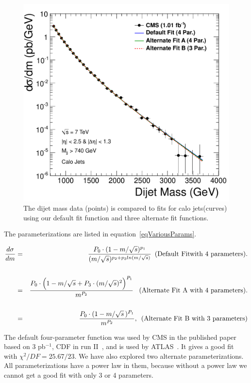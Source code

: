\begin{figure}[!ht]
  \begin{center}
        \includegraphics[width=\textwidth]
                        {Figures/DijetMass_withFit_All_calo.pdf}
    \caption{ 
The dijet mass data (points) is compared to fits for calo jets(curves)
using our default fit function and three alternate fit functions.}
    \label{dijetmassFitParams_calo}
  \end{center}
\end{figure}


\clearpage
The parameterizations are listed in equation~\ref{eqVariousParams}.

\begin{eqnarray}
{\frac{d\sigma}{dm}} 
 &=& {\frac{P_{0} \cdot (1 - m/\sqrt{s})^{p_{1}}}{(m/\sqrt{s})^{p_{2} + p_{3} ln(m/\sqrt{s})}}} \, \, \, \mbox{(Default Fitwith 4 parameters)}. \cr
 & & \cr
 &=& {\frac{P_{0} \cdot {\Big(1-m/\sqrt{s}+P_3\cdot(m/\sqrt{s})^2\Big)^{P_1}}}{m^{P_{2}}}} \, \, \,\mbox{ (Alternate Fit A with 4 parameters)}. \cr
 & & \cr
 &=& {\frac{P_{0} \cdot {(1-m/\sqrt{s}\,)^{P_1}} }{m^{P_{2}}}}, \, \, \, \mbox{(Alternate Fit B with 3 parameters)} \cr
\label{eqVariousParams}
\end{eqnarray}


The default four-parameter function was used by CMS in the published
paper based on 3 pb$^{-1}$, CDF in run
II~\cite{Aaltonen:2008dn}, and is used by ATLAS~\cite{ATLAS_Search}. It
gives a good fit with $\chi^2/DF=25.67/23$.  We have also explored two
alternate parameterizations.  All parameterizations have a power law
in them, because without a power law we cannot get a good fit with
only 3 or 4 parameters.

